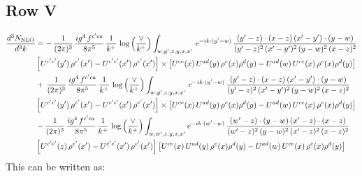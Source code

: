 \documentclass[9pt]{article}
\numberwithin{equation}{section}
\begin{document}
\subsection{Row V}
\begin{align}
    \frac{d^{3}N_{\rm NLO}}{d^{3}k} & =   -\,\frac{1}{(2\pi)^{3}}\, \frac{ig^{4}\,f^{c'ca}}{8\pi^{5}}\, \frac{1}{k^{+}}\,\log{\left(\frac{\vee}{k^{+}}\right)} \int_{w,y',z,y,x,x'}\, e^{-ik\cdot (y'-w)}\,\frac{(y'-z)\cdot (x-z)\,(x'-y')\cdot (y-w)}{(y'-z)^{2}\,(x'-y')^{2}\,(y-w)^{2}\,(x-z)^{2}}\notag \\ & \left[U^{c'e'}(y')\,\rho^{e'}(x')-U^{c'e'}(x')\,\rho^{e'}(x')\right]\times  \left[U^{ce}(x)\,U^{ad}(y)\,\rho^{e}(x)\rho^{d}(y)-U^{ad}(w)\,U^{ce}(x)\,\rho^{e}(x)\rho^{d}(y)\right] \notag \\
&   +\,\frac{1}{(2\pi)^{3}}\, \frac{ig^{4}\,f^{c'ca}}{8\pi^{5}}\, \frac{1}{k^{+}}\,\log{\left(\frac{\vee}{k^{+}}\right)} \int_{w,y',z,y,x,x'}\, e^{-ik\cdot (y'-w)}\,\frac{(y'-z)\cdot (x-z)\,(x'-y')\cdot (y-w)}{(y'-z)^{2}\,(x'-y')^{2}\,(y-w)^{2}\,(x-z)^{2}}\notag \\ &   \left[U^{c'e'}(y')\,\rho^{e'}(x')-U^{c'e'}(x')\,\rho^{e'}(x')\right]\times  \left[U^{ce}(x)\,U^{ad}(y)\,\rho^{e}(x)\rho^{d}(y)-U^{ad}(w)\,U^{ce}(x)\,\rho^{e}(x)\rho^{d}(y)\right] \notag \\
&   -\frac{1}{(2\pi)^{3}}\, \frac{ig^{4}\,f^{c'ca}}{8\pi^{5}}\, \frac{1}{k^{+}}\,\log{\left(\frac{\vee}{k^{+}}\right)}\int_{w,w',z,y,x,x'} e^{-ik\cdot (w'-w)}\,\frac{(w'-z)\cdot (y-w)\,(x'-z)\cdot (x-z)}{(w'-z)^{2}\,(y-w)^{2}\,(x'-z)^{2}\,(x-z)^{2}}\notag \\
&   \left[U^{c'e'}(z)\,\rho^{e'}(x')-U^{c'e'}(x')\,\rho^{e'}(x')\right]\left[U^{ce}(x)\,U^{ad}(y)\,\rho^{e}(x)\rho^{d}(y)-U^{ad}(w)\,U^{ce}(x)\,\rho^{e}(x)\rho^{d}(y)\right]
\end{align}
This can be written as:
\end{document}
